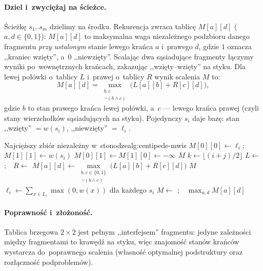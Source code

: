 \paragraph{Dziel i~zwyciężaj na ścieżce.}
Ścieżkę $s_1..s_m$ dzielimy na środku. Rekurencja zwraca tablicę
$M[a][d]$ ($a,d\in\{0,1\}$): $M[a][d]$ to maksymalna waga niezależnego podzbioru
danego fragmentu \emph{przy ustalonym} stanie lewego krańca $a$ i~prawego $d$,
gdzie $1$ oznacza ,,kraniec wzięty'', a~$0$ ,,niewzięty''. Scalając dwa sąsiadujące
fragmenty łączymy wyniki po~wewnętrznych krańcach, zakazując ,,wzięty--wzięty''
na styku. Dla lewej połówki o~tablicy $L$ i~prawej o~tablicy $R$ wynik scalenia
$M$ to:
\[
	M[a][d]=\max_{\substack{b,c\\ \neg(b\wedge c)}}\big(L[a][b]+R[c][d]\big),
\]
gdzie $b$ to stan prawego krańca lewej połówki, a~$c$ --- lewego krańca prawej
(czyli stany wierzchołków sąsiadujących na styku). Pojedynczy $s_i$ daje
bazę: stan ,,wzięty'' $=w(s_i)$, ,,niewzięty'' $=\ell_i$.

\begin{alg}{Najcięższy zbiór niezależny w~stonodze}{alg:centipede-mwis}
	\State $M[0][0]\gets\ell_i$;\ \ $M[1][1]\gets w(s_i)$
	\State $M[0][1]\gets M[1][0]\gets-\infty$
	\State \Return $M$
	\EndIf
	\State $k\gets\lfloor(i+j)/2\rfloor$
	\State $L\gets$ ;\ \ $R\gets$ 
	\State $M[a][d]\gets\max\limits_{\substack{b,c\in\{0,1\}\\ \neg(b\wedge c)}}\big(L[a][b]+R[c][d]\big)$
	\EndFor
	\State \Return $M$
	\EndFunction
	\Statex
	\State $\ell_i\gets\sum_{x\in L_i}\max(0,w(x))$ dla każdego $s_i$
	\State $M\gets$ ;\ \ \Return $\max_{a,d}M[a][d]$
\end{alg}

\paragraph{Poprawność i~złożoność.}
Tablica brzegowa $2\times 2$ jest pełnym ,,interfejsem'' fragmentu: jedyne
zależności między fragmentami to krawędź na styku, więc znajomość stanów krańców
wystarcza do~poprawnego scalenia (własność optymalnej podstruktury oraz rozłączność podproblemów).

